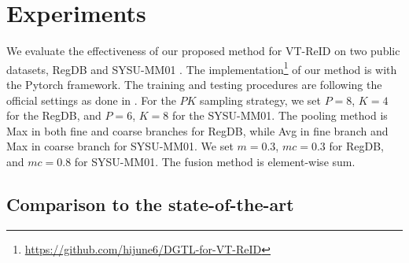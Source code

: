 \documentclass[journal]{IEEEtran}
\begin{document}
\section{Experiments}
We evaluate the effectiveness of our proposed method for VT-ReID on two public datasets, RegDB \cite{nguyen2017person} and  SYSU-MM01 \cite{wu2017rgb}.
The implementation\footnote{\url{https://github.com/hijune6/DGTL-for-VT-ReID}} of our method is with the Pytorch framework. The training and testing procedures are following the official settings as done in \cite{Ye2020DeepLF,Liu2020ParametersSE}.
For the $PK$ sampling strategy, we set $P = 8$, $K=4$ for the RegDB, and $P=6$, $K=8$ for the SYSU-MM01.
The pooling method is Max in both fine and coarse branches for RegDB, while Avg in fine branch and Max in coarse branch for SYSU-MM01.
We set $m = 0.3$, $mc = 0.3$ for RegDB, and $mc = 0.8$ for SYSU-MM01.
The fusion method is element-wise sum.

\subsection{Comparison to the state-of-the-art}
\end{document}
